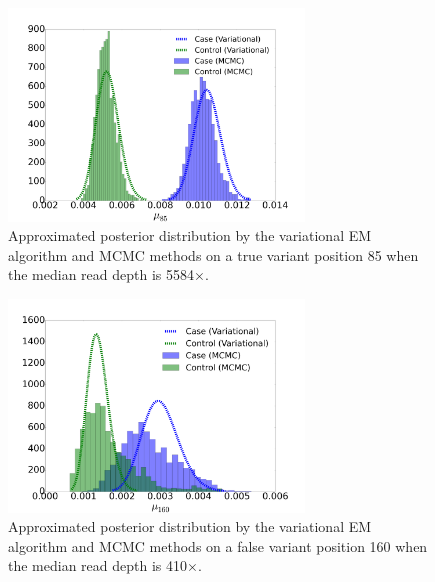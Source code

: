 \documentclass[11pt,reqno]{amsart}
\begin{document}
\begin{figure}[htbp]
\centering
\includegraphics[width=0.7\textwidth]{figs/position_85_5584_mcmc_vs_var_mu_fig1.png}
\caption{Approximated posterior distribution by the variational EM algorithm and MCMC methods on a true variant position 85 when the median read depth is 5584$\times$.}
\label{tbl:compare1}
\end{figure}

\begin{figure}[htbp]
\centering
\includegraphics[width=0.7\textwidth]{figs/position_160_410_mcmc_vs_var_mu_fig2.png}
\caption{Approximated posterior distribution by the variational EM algorithm and MCMC methods on a false variant position 160 when the median read depth is 410$\times$.}
\label{tbl:compare2}
\end{figure}
\end{document}

